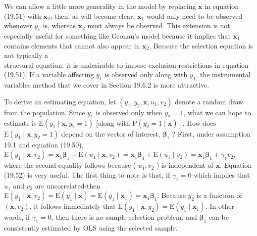 \documentclass[10pt]{article}
\begin{document}
We can allow a little more generality in the model by replacing $\mathbf{x}$ in equation (19.51) with $\mathbf{x}_{2}$; then, as will become clear, $\mathbf{x}_{1}$ would only need to be observed whenever $y_{1}$ is, whereas $\mathbf{x}_{2}$ must always be observed. This extension is not especially useful for something like Gronau's model because it implies that $\mathbf{x}_{1}$ contains elements that cannot also appear in $\mathbf{x}_{2}$. Because the selection equation is not typically a\\
structural equation, it is undesirable to impose exclusion restrictions in equation (19.51). If a variable affecting $y_{1}$ is observed only along with $y_{1}$, the instrumental variables method that we cover in Section 19.6.2 is more attractive.

To derive an estimating equation, let $\left(y_{1}, y_{2}, \mathbf{x}, u_{1}, v_{2}\right)$ denote a random draw from the population. Since $y_{1}$ is observed only when $y_{2}=1$, what we can hope to estimate is $\mathrm{E}\left(y_{1} \mid \mathbf{x}, y_{2}=1\right)$ [along with $\left.\mathrm{P}\left(y_{2}=1 \mid \mathbf{x}\right)\right]$. How does $\mathrm{E}\left(y_{1} \mid \mathbf{x}, y_{2}=1\right)$ depend on the vector of interest, $\boldsymbol{\beta}_{1}$ ? First, under assumption 19.1 and equation (19.50),\\
$\mathrm{E}\left(y_{1} \mid \mathbf{x}, v_{2}\right)=\mathbf{x}_{1} \boldsymbol{\beta}_{1}+\mathrm{E}\left(u_{1} \mid \mathbf{x}, v_{2}\right)=\mathbf{x}_{1} \boldsymbol{\beta}_{1}+\mathrm{E}\left(u_{1} \mid v_{2}\right)=\mathbf{x}_{1} \boldsymbol{\beta}_{1}+\gamma_{1} v_{2}$,\\
where the second equality follows because ( $u_{1}, v_{2}$ ) is independent of $\mathbf{x}$. Equation (19.52) is very useful. The first thing to note is that, if $\gamma_{1}=0$-which implies that $u_{1}$ and $v_{2}$ are uncorrelated-then $\mathrm{E}\left(y_{1} \mid \mathbf{x}, v_{2}\right)=\mathrm{E}\left(y_{1} \mid \mathbf{x}\right)=\mathrm{E}\left(y_{1} \mid \mathbf{x}_{1}\right)=\mathbf{x}_{1} \boldsymbol{\beta}_{1}$. Because $y_{2}$ is a function of $\left(\mathbf{x}, v_{2}\right)$, it follows immediately that $\mathrm{E}\left(y_{1} \mid \mathbf{x}, y_{2}\right)=\mathrm{E}\left(y_{1} \mid \mathbf{x}_{1}\right)$. In other words, if $\gamma_{1}=0$, then there is no sample selection problem, and $\boldsymbol{\beta}_{1}$ can be consistently estimated by OLS using the selected sample.
\end{document}
